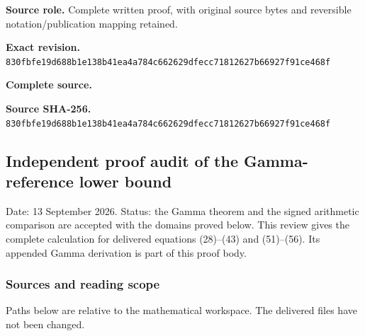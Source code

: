 \documentclass{article}
\begin{document}
\maketitle
\begingroup
\sloppy
\small

\noindent\textbf{Source role.} Complete written proof, with original source bytes and reversible notation/publication mapping retained.\par
\noindent\textbf{Exact revision.} \nolinkurl{830fbfe19d688b1e138b41ea4a784c662629dfecc71812627b66927f91ce468f}\par
\noindent\textbf{Complete source.} \par
\noindent\textbf{Source SHA-256.} \nolinkurl{830fbfe19d688b1e138b41ea4a784c662629dfecc71812627b66927f91ce468f}\par\medskip
\subsection{Independent proof audit of the Gamma-reference lower bound}\label{endpoint-gamma_review--independent-proof-audit-of-the-gamma-reference-lower-bound}

Date: 13 September 2026. Status: the Gamma theorem and the signed arithmetic comparison are accepted with the domains proved below. This review gives the complete calculation for delivered equations (28)--(43) and (51)--(56). Its appended Gamma derivation is part of this proof body.

\subsubsection{Sources and reading scope}\label{endpoint-gamma_review--sources-and-reading-scope}

Paths below are relative to the mathematical workspace. The delivered files have not been changed.
\end{document}
